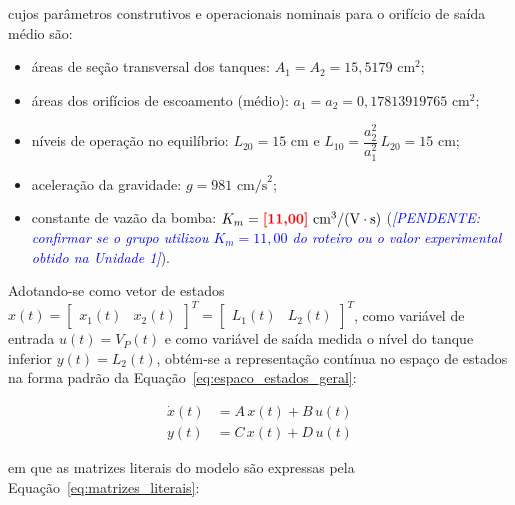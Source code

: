 \documentclass[a4paper,12pt]{article}
\newcommand{\dado}[1]{\textcolor{red}{\textbf{[#1]}}}
\newcommand{\pendente}[1]{\textcolor{blue}{\textit{[PENDENTE: #1]}}}
\newcommand{\dado}[1]{#1}
\newcommand{\pendente}[1]{}
\begin{document}
\begin{justify}
    \noindent cujos parâmetros construtivos e operacionais nominais para o orifício de saída médio são:
\end{justify}

\begin{itemize}
    \item áreas de seção transversal dos tanques: $A_1 = A_2 = 15{,}5179\text{ cm}^2$;
    \item áreas dos orifícios de escoamento (médio): $a_1 = a_2 = 0{,}17813919765\text{ cm}^2$;
    \item níveis de operação no equilíbrio: $L_{20} = 15\text{ cm}$ e $L_{10} = \dfrac{a_2^2}{a_1^2}\,L_{20} = 15\text{ cm}$;
    \item aceleração da gravidade: $g = 981\text{ cm/s}^2$;
    \item constante de vazão da bomba: $K_m = \dado{11{,}00}\text{ cm}^3/(\text{V}\cdot\text{s})$ (\pendente{confirmar se o grupo utilizou $K_m = 11{,}00$ do roteiro ou o valor experimental obtido na Unidade 1}).
\end{itemize}

\begin{justify}
    \hspace{4ex}Adotando-se como vetor de estados $x(t) = \begin{bmatrix} x_1(t) & x_2(t) \end{bmatrix}^T = \begin{bmatrix} L_1(t) & L_2(t) \end{bmatrix}^T$, como variável de entrada $u(t) = V_P(t)$ e como variável de saída medida o nível do tanque inferior $y(t) = L_2(t)$, obtém-se a representação contínua no espaço de estados na forma padrão da Equação~\eqref{eq:espaco_estados_geral}:
\end{justify}

\begin{equation}
    \begin{aligned}
        \dot{x}(t) &= A\,x(t) + B\,u(t) \\
        y(t) &= C\,x(t) + D\,u(t)
    \end{aligned}
    \label{eq:espaco_estados_geral}
\end{equation}

\begin{justify}
    \noindent em que as matrizes literais do modelo são expressas pela Equação~\eqref{eq:matrizes_literais}:
\end{justify}
\end{document}
